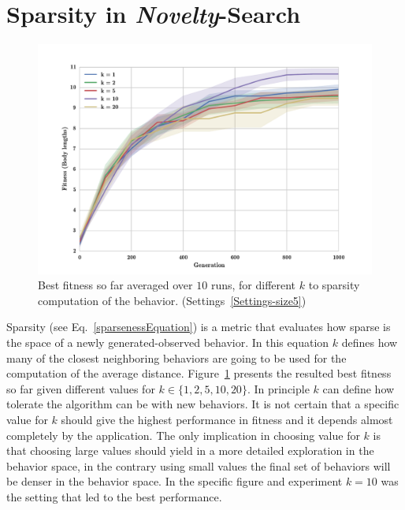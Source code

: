 \section{Sparsity in \emph{Novelty}-Search}


\begin{figure}[b!]
\centering
\includegraphics[width=1.0\textwidth]{../Figures/Results/KnnExperimentSize5.pdf}
\caption{Best fitness so far averaged over $10$ runs, for different $k$ to sparsity computation of the behavior. (Settings~\ref{Settings-size5})}
\label{fig:KnnExperimentSize5}
\end{figure}


Sparsity (see Eq.~\ref{sparsenessEquation}) is a metric that evaluates how sparse is the space of a newly generated-observed behavior. In this equation $k$ defines how many of the closest neighboring behaviors are going to be used for the computation of the average distance. Figure~\ref{fig:KnnExperimentSize5} presents the resulted best fitness so far given different values for $k \in \lbrace 1, 2, 5, 10, 20 \rbrace$. In principle $k$ can define how tolerate the algorithm can be with new behaviors. It is not certain that a specific value for $k$ should give the highest performance in fitness and it depends almost completely by the application. The only implication in choosing value for $k$ is that choosing large values should yield in a more detailed exploration in the behavior space, in the contrary using small values the final set of behaviors will be denser in the behavior space. In the specific figure and experiment $k=10$ was the setting that led to the best performance.







